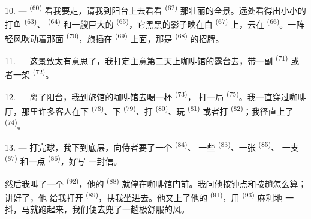 10. ---  \textsuperscript{(60)} 看我要走，请我到阳台上去看看
 \textsuperscript{(62)} 那壮丽的全景。远处看得出小小的打鱼
 \textsuperscript{(63)}、 \textsuperscript{(64)} 和一艘巨大的
 \textsuperscript{(65)}，它黑黑的影子映在白 \textsuperscript{(67)}
上，云在 \textsuperscript{(66)}。一阵轻风吹动着那面
\textsuperscript{(70)}，旗插在 \textsuperscript{(69)} 上面，那是
 \textsuperscript{(68)} 的招牌。

\VUsaut{3.0mm}
\VUsaut{3.0mm}

11. --- 这景致太有意思了，我打定主意第二天上咖啡馆的露台去，带一副
 \textsuperscript{(71)} 或者一架 \textsuperscript{(72)}。

12. --- 离了阳台，我到旅馆的咖啡馆去喝一杯 \textsuperscript{(73)}，
打一局 \textsuperscript{(75)}。我一直穿过咖啡厅，那里许多客人在下
 \textsuperscript{(78)}、下 \textsuperscript{(79)}、打
 \textsuperscript{(80)}、玩 \textsuperscript{(81)} 或者打
 \textsuperscript{(82)}；我径直上了 \textsuperscript{(74)}。

13. --- 打完球，我下到底层，向侍者要了一个 \textsuperscript{(84)}、
一些 \textsuperscript{(83)}、一张 \textsuperscript{(85)}、
一支 \textsuperscript{(87)} 和一点 \textsuperscript{(86)}，好写
一封信。

然后我叫了一个 \textsuperscript{(92)}，他的
\textsuperscript{(88)} 就停在咖啡馆门前。我问他按钟点和按趟怎么算；讲好了，他
给我打开 \textsuperscript{(89)}，扶我坐进去。他又上了他的
 \textsuperscript{(91)}，用 \textsuperscript{(93)} 麻利地
一抖，马就跑起来，我们便去兜了一趟极舒服的风。
\VUsaut{6.0mm}
\VUfilet{22mm}
